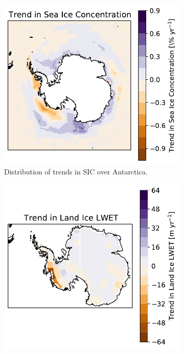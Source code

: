 \documentclass[../main.tex]{subfiles}
\begin{document}
\begin{figure}[h!]
\centering
\begin{subfigure}[h!]{0.49\textwidth}
\includegraphics[width=\textwidth]{images/week8/hres/trend_sic_distribution}
\caption{Distribution of trends in SIC over Antarctica.}
\end{subfigure}
\begin{subfigure}[h!]{0.49\textwidth}
\includegraphics[width=\textwidth]{images/week8/hres/trend_lic_distribution}

\end{subfigure}
\end{figure}
\end{document}
